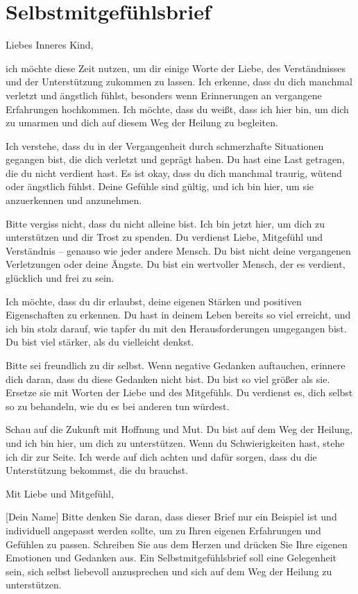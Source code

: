 \section{Selbstmitgefühlsbrief}
Liebes Inneres Kind,

ich möchte diese Zeit nutzen, um dir einige Worte der Liebe, des Verständnisses und der Unterstützung zukommen zu lassen. Ich erkenne, dass du dich manchmal verletzt und ängstlich fühlst, besonders wenn Erinnerungen an vergangene Erfahrungen hochkommen. Ich möchte, dass du weißt, dass ich hier bin, um dich zu umarmen und dich auf diesem Weg der Heilung zu begleiten.

Ich verstehe, dass du in der Vergangenheit durch schmerzhafte Situationen gegangen bist, die dich verletzt und geprägt haben. Du hast eine Last getragen, die du nicht verdient hast. Es ist okay, dass du dich manchmal traurig, wütend oder ängstlich fühlst. Deine Gefühle sind gültig, und ich bin hier, um sie anzuerkennen und anzunehmen.

Bitte vergiss nicht, dass du nicht alleine bist. Ich bin jetzt hier, um dich zu unterstützen und dir Trost zu spenden. Du verdienst Liebe, Mitgefühl und Verständnis – genauso wie jeder andere Mensch. Du bist nicht deine vergangenen Verletzungen oder deine Ängste. Du bist ein wertvoller Mensch, der es verdient, glücklich und frei zu sein.

Ich möchte, dass du dir erlaubst, deine eigenen Stärken und positiven Eigenschaften zu erkennen. Du hast in deinem Leben bereits so viel erreicht, und ich bin stolz darauf, wie tapfer du mit den Herausforderungen umgegangen bist. Du bist viel stärker, als du vielleicht denkst.

Bitte sei freundlich zu dir selbst. Wenn negative Gedanken auftauchen, erinnere dich daran, dass du diese Gedanken nicht bist. Du bist so viel größer als sie. Ersetze sie mit Worten der Liebe und des Mitgefühls. Du verdienst es, dich selbst so zu behandeln, wie du es bei anderen tun würdest.

Schau auf die Zukunft mit Hoffnung und Mut. Du bist auf dem Weg der Heilung, und ich bin hier, um dich zu unterstützen. Wenn du Schwierigkeiten hast, stehe ich dir zur Seite. Ich werde auf dich achten und dafür sorgen, dass du die Unterstützung bekommst, die du brauchst.

Mit Liebe und Mitgefühl,

[Dein Name]
Bitte denken Sie daran, dass dieser Brief nur ein Beispiel ist und individuell angepasst werden sollte, um zu Ihren eigenen Erfahrungen und Gefühlen zu passen. Schreiben Sie aus dem Herzen und drücken Sie Ihre eigenen Emotionen und Gedanken aus. Ein Selbstmitgefühlsbrief soll eine Gelegenheit sein, sich selbst liebevoll anzusprechen und sich auf dem Weg der Heilung zu unterstützen.



